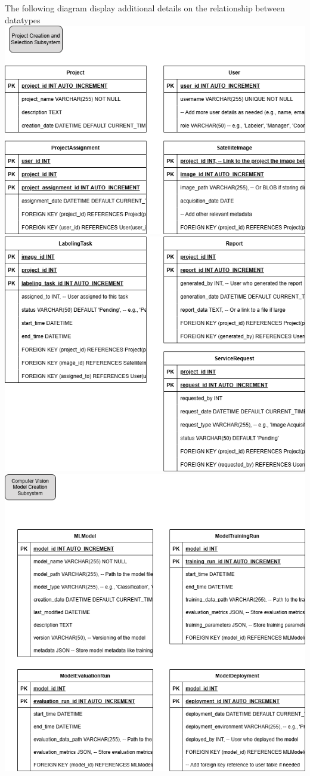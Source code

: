 \documentclass[12pt, titlepage]{article}
\begin{document}
The following diagram display additional details on the relationship between datatypes\\ 
\includegraphics[scale=0.5]{dt3.png}\\
\includegraphics[scale=0.5]{dt4.png}\\
\includegraphics[scale=0.5]{dt1.png}\\
\end{document}
